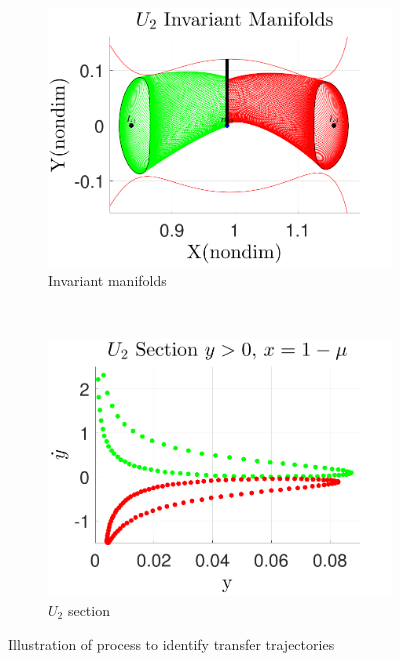 \documentclass[preprint]{elsarticle}
\begin{document}
\begin{figure}
     \centering
        \begin{subfigure}[b]{0.5\textwidth}
                \includegraphics[width=\columnwidth]{U2_Manifolds}
                \caption{Invariant manifolds }
                \label{fig:manifolds}
        \end{subfigure}%
        ~
        \begin{subfigure}[b]{0.5\textwidth}
                \includegraphics[width=\columnwidth]{U2_poincare}
                \caption{\(U_2\) \Poincare section}
                \label{fig:poincare}
        \end{subfigure}
        \caption{Illustration of process to identify transfer trajectories}
	\label{fig:manifold_transfer_example}
\end{figure}
\end{document}
